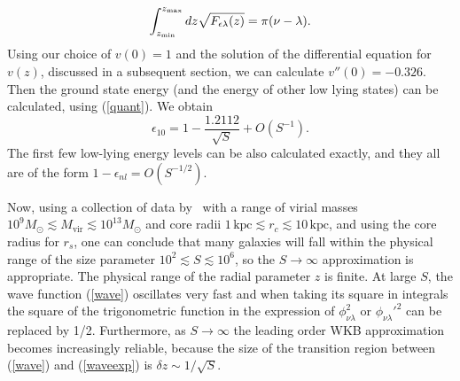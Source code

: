 \documentclass[aps,prl,twocolumn]{revtex4}
\begin{document}
\begin{align}\label{quant}
    \int_{z_{\rm min}}^{z_{\rm max}} dz\sqrt{F_{\epsilon\lambda}(z)}=\pi(\nu-\lambda).
\end{align}
Using our choice of $v(0)=1$ and  the solution of the differential equation for $v(z)$, discussed in a subsequent section, we can calculate  $v''(0)=-0.326$. Then the ground state energy (and the energy of other low lying states) can be calculated, using  (\ref{quant}). We obtain
\begin{equation*}
\epsilon_{10}=1-\frac{1.2112}{\sqrt{S}}+O(S^{-1}).
\end{equation*}
The first few low-lying energy levels can be also calculated exactly, and they all are of the form $1-\epsilon_{nl}=O(S^{-1/2}).$

Now, using a collection of data by~\cite{Rodrigues} with a range of virial masses $10^9 M_\odot \lesssim M_\text{vir} \lesssim 10^{13} M_\odot$ and core radii $1 \, \text{kpc} \lesssim r_c \lesssim 10 \, \text{kpc}$, and using the core radius for $r_s$, one can conclude that many galaxies will fall within the physical range of the size parameter $10^2\lesssim S\lesssim 10^6$, so the $S\to\infty$ approximation is appropriate.  The physical range of the radial parameter $z$ is finite. At large $S$, the wave function  (\ref{wave}) oscillates very fast and when taking its square in integrals the square of the trigonometric function in the expression of $\phi_{\nu\lambda}^2$ or $\phi_{\nu\lambda}'^2$ can be replaced by 1/2.  
Furthermore, as $S\to\infty$ the leading order WKB approximation becomes  increasingly reliable, because the size of the transition region between (\ref{wave}) and  (\ref{waveexp}) is $\delta z\sim 1/\sqrt{S}$.
 
\end{document}
